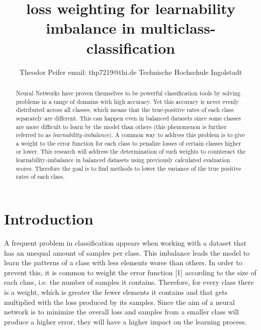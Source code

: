 \documentclass[journal]{IEEEtran}
\begin{document}
\title{\textbf{loss weighting for learnability imbalance in multiclass-classification}}



\author{Theodor Peifer
        \linebreak
        email: thp7219@thi.de
        \linebreak
        Technische Hochschule Ingolstadt
}



\maketitle


\begin{abstract}
Neural Networks have proven themselves to be powerful classification
tools by solving problems in a range of domains with high accuracy.
Yet this accuracy is never evenly distributed across all classes, which means that the true-positive rates of each class separately are different.
This can happen even in balanced datasets since some classes are more difficult to learn by the model than others (this phenomenon is further referred to as \emph{learnability-imbalance}).
A common way to address this problem is to give a weight to the error function for each class to penalize losses of certain classes higher or lower.
This research will address the determination of such weights to counteract the learnability-imbalance in balanced datasets using previously calculated evaluation scores.
Therefore the goal is to find methods to lower the variance of the true positive rates of each class.
\end{abstract}


\section{Introduction}
A frequent problem in classification appears when working with a dataset that has an unequal amount of samples per class.
This imbalance leads the model to learn the patterns of a class with less elements worse than others.
In order to prevent this, it is common to weight the error function [1] according to the size of each class, i.e. the number of samples it contains.
Therefore, for every class there is a weight, which is greater the fewer elements it contains and that gets multiplied with the loss produced by its samples.
Since the aim of a neural network is to minimize the overall loss and samples from a smaller class will produce a higher error, they will have a higher impact on the learning process.
\end{document}
